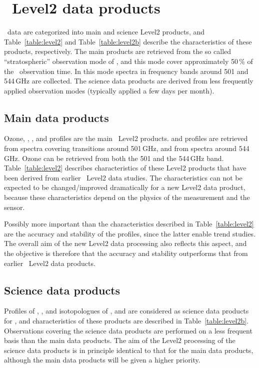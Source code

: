 \section{\smr\ Level2 data products}

\smr\ data are categorized into main and science Level2 products, and
Table~\ref{table:level2} and Table~\ref{table:level2b} describe the
characteristics of these products, respectively.  The main products are
retrieved from the so called ``stratospheric'' observation mode of \smr, and
this mode cover approximately 50\,\(\%\) of the \smr\ observation time.  In
this mode spectra in frequency bands around 501 and 544\,GHz are collected.
The science data products are derived from less frequently applied observation
modes (typically applied a few days per month).


\subsection{Main data products}

Ozone, , , and  profiles are the main
\smr\ Level2 products.   and  profiles are retrieved
from spectra covering transitions around 501\,GHz, and  from
spectra around 544\,GHz.  Ozone can be retrieved from both the 501 and the
544\,GHz band.  Table~\ref{table:level2} describes characteristics of these
Level2 products that have been derived from earlier \smr\ Level2 data studies.
The characteristics can not be expected to be changed/improved dramatically for
a new Level2 data product, because these characteristics depend on the physics
of the measurement and the sensor.

Possibly more important than the characteristics described in
Table~\ref{table:level2} are the accuracy and stability of the profiles, since
the latter enable trend studies.  The overall aim of the new Level2 data
processing also reflects this aspect, and the objective is therefore that the
accuracy and stability outperforms that from earlier \smr\ Level2 data
products.

\subsection{Science data products}

Profiles of , ,  and isotopologues of
, and  are considered as science data products for
\smr, and characteristics of these products are described in
Table~\ref{table:level2b}.  Observations covering the science data products are
performed on a less frequent basis than the main data products. The aim of the
Level2 processing of the science data products is in principle identical to
that for the main data products, although the main data products will be given
a higher priority.
